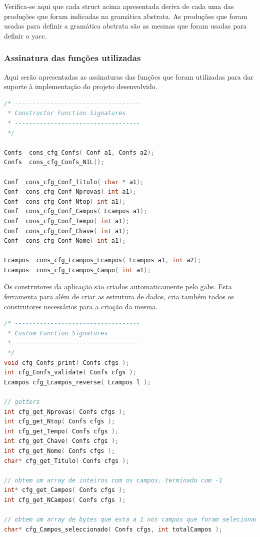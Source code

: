\documentclass[11pt, a4paper, oneside]{article}
\begin{document}
Verifica-se aqui que cada \textsf{struct} acima apresentada deriva de cada uma das produções que foram indicadas na gramática abstrata.
As produções que foram usadas para definir a gramática abstrata são as mesmas que foram usadas para definir o \textsf{yacc}.
\newpage

\subsubsection{Assinatura das funções utilizadas}
Aqui serão apresentadas as assinaturas das funções que foram utilizadas para dar suporte à implementação do projeto desenvolvido.

\begin{lstlisting}[language=C, caption={Construtores do ficheiro de configuração.}]
/* -----------------------------------
 * Constructor Function Signatures
 * -----------------------------------
 */

Confs  cons_cfg_Confs( Conf a1, Confs a2);
Confs  cons_cfg_Confs_NIL();

Conf  cons_cfg_Conf_Titulo( char * a1);
Conf  cons_cfg_Conf_Nprovas( int a1);
Conf  cons_cfg_Conf_Ntop( int a1);
Conf  cons_cfg_Conf_Campos( Lcampos a1);
Conf  cons_cfg_Conf_Tempo( int a1);
Conf  cons_cfg_Conf_Chave( int a1);
Conf  cons_cfg_Conf_Nome( int a1);

Lcampos  cons_cfg_Lcampos_Lcampos( Lcampos a1, int a2);
Lcampos  cons_cfg_Lcampos_Campo( int a1);
\end{lstlisting} 

Os construtores da aplicação são criados automaticamente pelo \textsf{gabs}. Esta ferramenta para além de criar as estrutura de dados, cria também todos os construtores necessários para a criação da mesma.

\begin{lstlisting}[language=C, caption={Funções do ficheiro de configuração.}]
/* -----------------------------------
 * Custom Function Signatures
 * -----------------------------------
 */
void cfg_Confs_print( Confs cfgs );
int cfg_Confs_validate( Confs cfgs );
Lcampos cfg_Lcampos_reverse( Lcampos l );

// getters
int cfg_get_Nprovas( Confs cfgs );
int cfg_get_Ntop( Confs cfgs );
int cfg_get_Tempo( Confs cfgs );
int cfg_get_Chave( Confs cfgs );
int cfg_get_Nome( Confs cfgs );
char* cfg_get_Titulo( Confs cfgs );

// obtem um array de inteiros com os campos. terminado com -1
int* cfg_get_Campos( Confs cfgs );
int cfg_get_NCampos( Confs cfgs );

// obtem um array de bytes que esta a 1 nos campos que foram selecionados
char* cfg_Campos_seleccionado( Confs cfgs, int totalCampos );
\end{lstlisting} 
\end{document}
